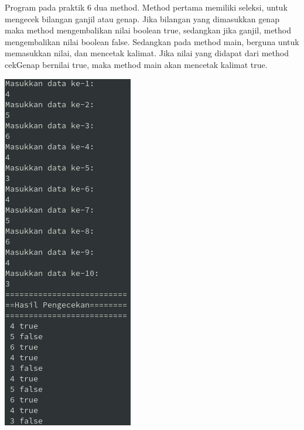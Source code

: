\documentclass[a4paper,12pt]{article}
\begin{document}
Program pada praktik 6 dua method. Method pertama memiliki seleksi, untuk mengecek bilangan ganjil atau genap. Jika
bilangan yang dimasukkan genap maka method mengembalikan nilai boolean true, sedangkan jika ganjil, method mengembalikan
nilai boolean false. Sedangkan pada method main, berguna untuk memasukkan nilai, dan mencetak kalimat. Jika nilai yang
didapat dari method cekGenap bernilai true, maka method main akan mencetak kalimat true.
\begin{center}
    \includegraphics[scale=1]{6.png} 
\end{center}
\end{document}
